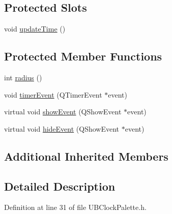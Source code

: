 \subsection*{Protected Slots}
\begin{DoxyCompactItemize}
\item 
void \hyperlink{class_u_b_clock_palette_af182ee7c7861497da735349c46475686}{update\-Time} ()
\end{DoxyCompactItemize}
\subsection*{Protected Member Functions}
\begin{DoxyCompactItemize}
\item 
int \hyperlink{class_u_b_clock_palette_a64df46fcd7c5482d72c5e78d6ad53dfa}{radius} ()
\item 
void \hyperlink{class_u_b_clock_palette_a87886235da46f6b6abb1ba1bb77c13ed}{timer\-Event} (Q\-Timer\-Event $\ast$event)
\item 
virtual void \hyperlink{class_u_b_clock_palette_af46e4aa5486523a69f906f3cbf744612}{show\-Event} (Q\-Show\-Event $\ast$event)
\item 
virtual void \hyperlink{class_u_b_clock_palette_a55b656b42e46e1218f76fd4918c7eb29}{hide\-Event} (Q\-Show\-Event $\ast$event)
\end{DoxyCompactItemize}
\subsection*{Additional Inherited Members}


\subsection{Detailed Description}


Definition at line 31 of file U\-B\-Clock\-Palette.\-h.



